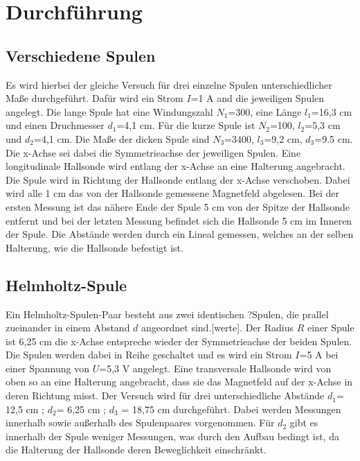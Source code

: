 \section{Durchführung}
\label{sec:Durchführung}

    \subsection{Verschiedene Spulen}

        Es wird hierbei der gleiche Versuch für drei einzelne Spulen 
        unterschiedlicher Maße durchgeführt. Dafür wird ein Strom $I$=1 \si{\ampere}
        and die jeweiligen Spulen angelegt. Die lange Spule hat eine 
        Windungszahl $N_1$=300, eine Länge $l_1$=16,3 \si{\centi\meter} und 
        einen Druchmesser $d_1$=4,1 \si{\centi\meter}. Für die kurze Spule ist 
        $N_2$=100, $l_2$=5,3 \si{\centi\meter} und $d_2$=4,1 \si{\centi\meter}.
        Die Maße der dicken Spule sind $N_3$=3400, $l_3$=9,2 \si{\centi\meter},
        $d_3$=9.5 \si{\centi\m}. Die x-Achse sei dabei die Symmetrieachse 
        der jeweiligen Spulen. Eine longitudinale Hallsonde wird entlang der x-Achse
        an eine Halterung angebracht. Die Spule wird in Richtung der Hallsonde
        entlang der x-Achse verschoben. Dabei wird alle 1 \si{\centi\meter} das von 
        der Hallsonde gemessene Magnetfeld abgelesen. Bei der ersten Messung ist das nähere 
        Ende der Spule 5 \si{\centi\meter} von der Spitze der Hallsonde entfernt und bei 
        der letzten Messung befindet sich die Hallsonde 5 \si{\centi\meter} im Inneren
        der Spule. Die Abstände werden durch ein Lineal gemessen, welches an der selben
        Halterung, wie die Hallsonde befestigt ist.

    \subsection{Helmholtz-Spule}
        
        Ein Helmholtz-Spulen-Paar besteht aus zwei identischen ?Spulen, die prallel zueinander
        in einem Abstand $d$ angeordnet sind.[werte]. Der Radius $R$ einer Spule ist 6,25 \si{\centi\meter}
        die x-Achse entspreche wieder der Symmetrieachse der beiden Spulen. Die Spulen werden dabei in
        Reihe geschaltet und es wird ein Strom $I$=5 \si{\ampere} bei einer Spannung von $U$=5,3 \si{\volt}
        angelegt. Eine transversale Hallsonde wird von oben so an eine Halterung angebracht, 
        dass sie das Magnetfeld auf 
        der x-Achse in deren Richtung misst. Der Versuch wird für drei unterschiedliche 
        Abstände $d_1$= 12,5 \si{\centi\meter} ; $d_2$= 6,25 \si{\centi\meter} ; 
        $d_3$ = 18,75 \si{\centi\meter} durchgeführt. Dabei werden Messungen innerhalb sowie außerhalb 
        des Spulenpaares vorgenommen. Für $d_2$ gibt es innerhalb der Spule weniger Messungen, was
        durch den Aufbau bedingt ist, da die Halterung der Hallsonde deren Beweglichkeit einschränkt.

